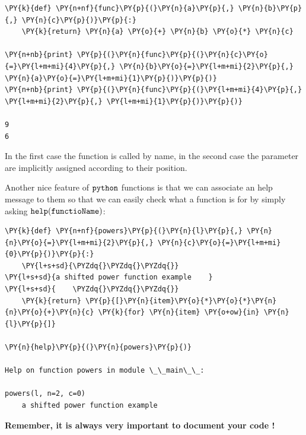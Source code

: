 \begin{tcolorbox}[breakable, size=fbox, boxrule=1pt, pad at break*=1mm,colback=cellbackground, colframe=cellborder]
\begin{Verbatim}[commandchars=\\\{\}]
\PY{k}{def} \PY{n+nf}{func}\PY{p}{(}\PY{n}{a}\PY{p}{,} \PY{n}{b}\PY{p}{,} \PY{n}{c}\PY{p}{)}\PY{p}{:}
    \PY{k}{return} \PY{n}{a} \PY{o}{+} \PY{n}{b} \PY{o}{*} \PY{n}{c}

\PY{n+nb}{print} \PY{p}{(}\PY{n}{func}\PY{p}{(}\PY{n}{c}\PY{o}{=}\PY{l+m+mi}{4}\PY{p}{,} \PY{n}{b}\PY{o}{=}\PY{l+m+mi}{2}\PY{p}{,} \PY{n}{a}\PY{o}{=}\PY{l+m+mi}{1}\PY{p}{)}\PY{p}{)}
\PY{n+nb}{print} \PY{p}{(}\PY{n}{func}\PY{p}{(}\PY{l+m+mi}{4}\PY{p}{,} \PY{l+m+mi}{2}\PY{p}{,} \PY{l+m+mi}{1}\PY{p}{)}\PY{p}{)}

9
6
\end{Verbatim}
\end{tcolorbox}

In the first case the function is called by name, in the second case the parameter are implicitly assigned according to their position.

Another nice feature of $\tt{python}$ functions is that we can associate an help message to them so that we can easily check what a function is for by simply asking $\tt{help(functioName)}$:

\begin{tcolorbox}[breakable, size=fbox, boxrule=1pt, pad at break*=1mm,colback=cellbackground, colframe=cellborder]
\begin{Verbatim}[commandchars=\\\{\}]
\PY{k}{def} \PY{n+nf}{powers}\PY{p}{(}\PY{n}{l}\PY{p}{,} \PY{n}{n}\PY{o}{=}\PY{l+m+mi}{2}\PY{p}{,} \PY{n}{c}\PY{o}{=}\PY{l+m+mi}{0}\PY{p}{)}\PY{p}{:}
    \PY{l+s+sd}{\PYZdq{}\PYZdq{}\PYZdq{}}
\PY{l+s+sd}{a shifted power function example    }
\PY{l+s+sd}{    \PYZdq{}\PYZdq{}\PYZdq{}}
    \PY{k}{return} \PY{p}{[}\PY{n}{item}\PY{o}{*}\PY{o}{*}\PY{n}{n}\PY{o}{+}\PY{n}{c} \PY{k}{for} \PY{n}{item} \PY{o+ow}{in} \PY{n}{l}\PY{p}{]}

\PY{n}{help}\PY{p}{(}\PY{n}{powers}\PY{p}{)}

Help on function powers in module \_\_main\_\_:

powers(l, n=2, c=0)
    a shifted power function example
\end{Verbatim}
\end{tcolorbox}

\textbf{Remember, it is always very important to document your code !}

